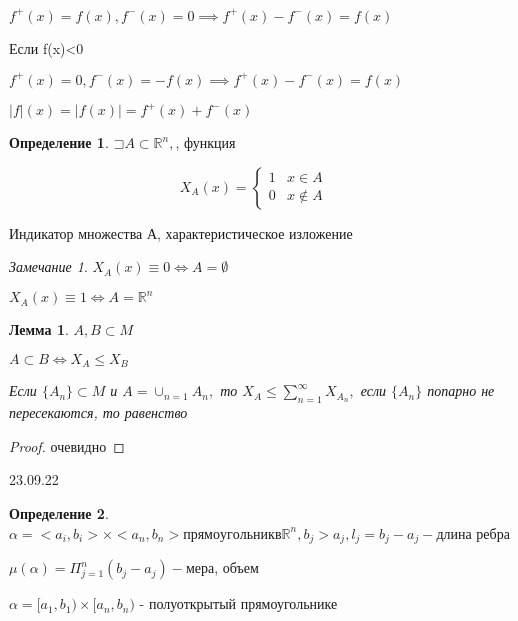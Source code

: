 \documentclass[a4paper, 12pt]{article}
\newcommand\letsymbol{\mathord{\sqsupset}}
\newtheorem{lemma}{Лемма}[section]
\theoremstyle{definition}
\newtheorem*{definition}{Определение}
\theoremstyle{remark}
\newtheorem*{remark}{Замечание}
\begin{document}
$f^{+}(x) = f(x), f^{-}(x) = 0\implies f^{+}(x) - f^{-}(x) = f(x)$

Если f(x)<0

$f^{+}(x) = 0, f^{-}(x) = -f(x)\implies f^{+}(x) -f^{-}(x) = f(x)$

$|f|(x) = |f(x)| = f^{+}(x) + f^{-}(x)$

\begin{definition}
     $\letsymbol A\subset \mathbb{R}^n, $, функция

     
     \begin{equation*}
          X_A(x) = 
           \begin{cases}
             1 &\text{$x\in A\quad$} \\
             0 &\text{$x \notin A\quad$}
           \end{cases}
     \end{equation*}

Индикатор множества А, характеристическое изложение
\end{definition}
\begin{remark}
     $X_A(x)\equiv 0\Leftrightarrow A=\emptyset$

     $X_A(x)\equiv 1\Leftrightarrow A=\mathbb{R}^n $
\end{remark}
\begin{lemma}
     $A, B\subset M$
     
     $A\subset B \Leftrightarrow X_A \leq X_B$

     Если $\{A_n\}\subset M$ и $A ={\cup}_{n=1}A_n,$ то $X_A\leq \sum_{n = 1}^{\infty} X_{A_n},$ если $\{A_n\}$
     попарно не пересекаются, то равенство
\end{lemma}

\begin{proof}
     очевидно
\end{proof}

23.09.22

\begin{definition}
     $\alpha = <a_i, b_i> \times <a_n, b_n> прямоугольник в \mathbb{R}^n, b_j>a_j, l_j = b_j - a_j - $длина ребра 
\end{definition}
$\mu(\alpha) = \Pi_{j=1}^n (b_j - a_j) -$мера, объем

$\alpha =[a_1, b_1)\times[a_n, b_n)$ - полуоткрытый прямоугольнике
\end{document}
